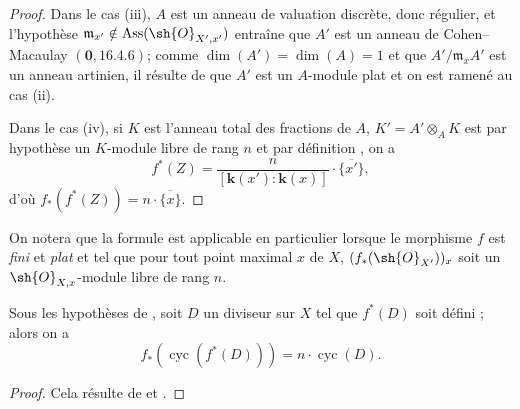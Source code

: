 \begin{proof}
Dans le cas (iii), $A$ est un anneau de valuation discrète, donc régulier, et l'hypothèse $\mathfrak{m}_{x'}\notin\operatorname{Ass}(\sh{O}_{X',x'})$ entraîne que $A'$ est un anneau de Cohen--Macaulay $(\mathbf{0},16.4.6)$;
comme $\dim(A')=\dim(A)=1$ et que $A'/\mathfrak{m}_xA'$ est un anneau artinien, il résulte de  que $A'$ est un $A$-module plat et on est ramené au cas (ii).

Dans le cas (iv), si $K$ est l'anneau total des fractions de $A$, $K'=A'\otimes_AK$ est par hypothèse un $K$-module libre de rang $n$ et par définition , on a
\[
  f^*(Z)=\frac{n}{[\boldsymbol{k}(x'): \boldsymbol{k}(x)]}\cdot\overline{\{x'\}},
\]
d'où $f_*(f^*(Z))=n\cdot\overline{\{x\}}$.
\end{proof}

On notera que la formule  est applicable en particulier lorsque le morphisme $f$ est \emph{fini} et \emph{plat} et tel que pour tout point maximal $x$ de $X$, $(f_*(\sh{O}_{X'}))_x$ soit un $\sh{O}_{X,x}$-module libre de rang $n$.

\begin{corollary}[21.10.19]
\label{IV.21.10.19}
Sous les hypothèses de , soit $D$ un diviseur sur $X$ tel que $f^*(D)$ soit défini ; alors on a
\[
\label{IV.21.10.19.1}
  f_*(\operatorname{cyc}(f^*(D)))=n\cdot\operatorname{cyc}(D).
  \tag{21.10.19.1}
\]
\end{corollary}

\begin{proof}
Cela résulte de  et .
\end{proof}
